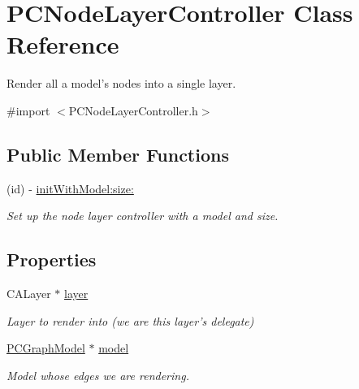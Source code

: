 \hypertarget{interface_p_c_node_layer_controller}{
\section{PCNodeLayerController Class Reference}
\label{interface_p_c_node_layer_controller}
}


Render all a model's nodes into a single layer.  




{\ttfamily \#import $<$PCNodeLayerController.h$>$}

\subsection*{Public Member Functions}
\begin{DoxyCompactItemize}
\item 
\hypertarget{interface_p_c_node_layer_controller_ab6e09dd172c5147984de8331054ad70f}{
(id) -\/ \hyperlink{interface_p_c_node_layer_controller_ab6e09dd172c5147984de8331054ad70f}{initWithModel:size:}}
\label{interface_p_c_node_layer_controller_ab6e09dd172c5147984de8331054ad70f}

\begin{DoxyCompactList}\small\item\em Set up the node layer controller with a model and size. \end{DoxyCompactList}\end{DoxyCompactItemize}
\subsection*{Properties}
\begin{DoxyCompactItemize}
\item 
\hypertarget{interface_p_c_node_layer_controller_a82a7cfc89827038d3acec3e22bc3aa34}{
CALayer $\ast$ \hyperlink{interface_p_c_node_layer_controller_a82a7cfc89827038d3acec3e22bc3aa34}{layer}}
\label{interface_p_c_node_layer_controller_a82a7cfc89827038d3acec3e22bc3aa34}

\begin{DoxyCompactList}\small\item\em Layer to render into (we are this layer's delegate) \end{DoxyCompactList}\item 
\hypertarget{interface_p_c_node_layer_controller_a1dddc66d06474589ef1d53a174fec32a}{
\hyperlink{interface_p_c_graph_model}{PCGraphModel} $\ast$ \hyperlink{interface_p_c_node_layer_controller_a1dddc66d06474589ef1d53a174fec32a}{model}}
\label{interface_p_c_node_layer_controller_a1dddc66d06474589ef1d53a174fec32a}

\begin{DoxyCompactList}\small\item\em Model whose edges we are rendering. \end{DoxyCompactList}\end{DoxyCompactItemize}


